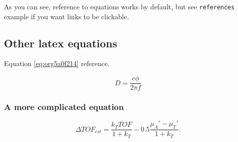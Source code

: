 As you can see, reference to equations works by default, but see \texttt{references}
example if you want links to be clickable.

\subsection{Other latex equations}
\label{sec:org7773c0f}
Equation \ref{eq:org5a0f214} reference.

\begin{equation}
\label{eq:org5a0f214}
D = \frac{c\phi}{2\pi f}
\end{equation}

\subsubsection{A more complicated equation}
\label{sec:org58ac0b7}

\begin{equation}
\Delta TOF_{est} = \frac{k_T TOF}{1+k_T } - 0.5 \frac{\mu_A' - \mu_T'}{1+k_T}.
\end{equation}


